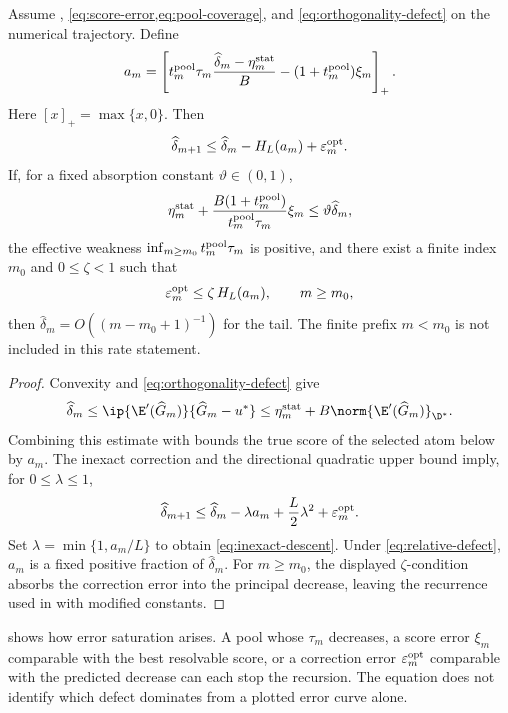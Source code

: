 \begin{theorem}
\label{thm:inexact}
Assume , \cref{eq:score-error,eq:pool-coverage}, and
\cref{eq:orthogonality-defect} on the numerical trajectory. Define
\[
 a_m=\left[
 t_m^{\rm pool}\tau_m\frac{\widehat\delta_m-\eta_m^{\rm stat}}{B}
 -(1+t_m^{\rm pool})\xi_m
 \right]_+.
\]
Here \([x]_+=\max\{x,0\}\).
Then
\begin{equation}
 \widehat\delta_{m+1}\leq\widehat\delta_m-H_L(a_m)+\varepsilon_m^{\rm opt}.
 \label{eq:inexact-descent}
\end{equation}
If, for a fixed absorption constant \(\vartheta\in(0,1)\),
\begin{equation}
 \eta_m^{\rm stat}+\frac{B(1+t_m^{\rm pool})}{t_m^{\rm pool}\tau_m}\xi_m
 \leq\vartheta\widehat\delta_m,
 \label{eq:relative-defect}
\end{equation}
the effective weakness \(\inf_{m\ge m_0} t_m^{\rm pool}\tau_m\) is positive, and there
exist a finite index \(m_0\) and \(0\leq\zeta<1\) such that
\[
  \varepsilon_m^{\rm opt}\leq\zeta\,H_L(a_m),\qquad m\ge m_0,
\]
then \(\widehat\delta_m=O((m-m_0+1)^{-1})\) for the tail. The finite prefix
\(m<m_0\) is not included in this rate statement.
\end{theorem}

\begin{proof}
Convexity and \cref{eq:orthogonality-defect} give
\[
 \widehat\delta_m
 \leq\ip{\E'(\widehat G_m)}{\widehat G_m-u^*}
 \leq\eta_m^{\rm stat}+B\norm{\E'(\widehat G_m)}_{\D^*}.
\]
Combining this estimate with  bounds the true score of the selected atom below by
\(a_m\). The inexact correction and the directional quadratic upper bound imply, for
\(0\leq\lambda\leq1\),
\[
 \widehat\delta_{m+1}\leq\widehat\delta_m-\lambda a_m+\frac{L}{2}\lambda^2+\varepsilon_m^{\rm opt}.
\]
Set \(\lambda=\min\{1,a_m/L\}\) to obtain \cref{eq:inexact-descent}. Under
\cref{eq:relative-defect}, \(a_m\) is a fixed positive fraction of \(\widehat\delta_m\). For
\(m\ge m_0\), the displayed \(\zeta\)-condition absorbs the correction error into the
principal decrease, leaving the recurrence used in  with modified constants.
\end{proof}

\begin{remark}
 shows how error saturation arises. A pool whose
\(\tau_m\) decreases, a score error \(\xi_m\) comparable with the best resolvable score, or a correction
error \(\varepsilon_m^{\rm opt}\) comparable with the predicted decrease can each stop the recursion. The equation
does not identify which defect dominates from a plotted error curve alone.
\end{remark}

